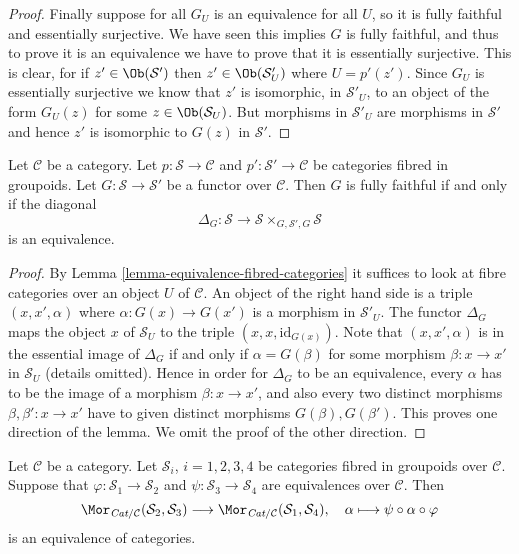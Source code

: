 \begin{proof}
\medskip\noindent
Finally suppose for all $G_U$ is an equivalence for all $U$, so it is
fully faithful and essentially surjective.  We have seen this implies $G$ is
fully faithful, and thus to prove it is an equivalence we have to prove that
it is essentially surjective.  This is clear, for if $z'\in
\Ob(\mathcal{S}')$ then $z'\in \Ob(\mathcal{S}'_U)$ where
$U = p'(z')$.  Since $G_U$ is essentially surjective we know that
$z'$ is isomorphic, in $\mathcal{S}'_U$, to an object of the form
$G_U(z)$ for some $z\in \Ob(\mathcal{S}_U)$.  But morphisms
in $\mathcal{S}'_U$ are morphisms in $\mathcal{S}'$ and hence $z'$ is
isomorphic to $G(z)$ in $\mathcal{S}'$.
\end{proof}

\begin{lemma}
\label{lemma-fully-faithful-diagonal-equivalence}
Let $\mathcal{C}$ be a category. Let $p : \mathcal{S}\to \mathcal{C}$ and
$p' : \mathcal{S'}\to \mathcal{C}$ be categories fibred in groupoids.
Let $G : \mathcal{S}\to \mathcal {S}'$ be a functor over $\mathcal{C}$.
Then $G$ is fully faithful if and only if the diagonal
$$
\Delta_G :
\mathcal{S}
\longrightarrow
\mathcal{S} \times_{G, \mathcal{S}', G} \mathcal{S}
$$
is an equivalence.
\end{lemma}

\begin{proof}
By
Lemma \ref{lemma-equivalence-fibred-categories}
it suffices to look at fibre categories over an object $U$ of $\mathcal{C}$.
An object of the right hand side is a triple $(x, x', \alpha)$ where
$\alpha : G(x) \to G(x')$ is a morphism in $\mathcal{S}'_U$.
The functor $\Delta_G$ maps the object $x$ of $\mathcal{S}_U$
to the triple $(x, x, \text{id}_{G(x)})$. Note that $(x, x', \alpha)$
is in the essential image of $\Delta_G$ if and only if $\alpha = G(\beta)$
for some morphism $\beta : x \to x'$ in $\mathcal{S}_U$ (details omitted).
Hence in order for $\Delta_G$ to be an equivalence, every $\alpha$ has to
be the image of a morphism $\beta : x \to x'$, and also every two
distinct morphisms $\beta, \beta' : x \to x'$ have to given distinct
morphisms $G(\beta), G(\beta')$. This proves one direction of the lemma.
We omit the proof of the other direction.
\end{proof}

\begin{lemma}
\label{lemma-morphisms-equivalent-fibred-groupoids}
Let $\mathcal{C}$ be a category.
Let $\mathcal{S}_i$, $i = 1, 2, 3, 4$ be categories fibred in
groupoids over $\mathcal{C}$.
Suppose that $\varphi : \mathcal{S}_1 \to \mathcal{S}_2$ and
$\psi : \mathcal{S}_3 \to \mathcal{S}_4$ are equivalences
over $\mathcal{C}$. Then
$$
\Mor_{\textit{Cat}/\mathcal{C}}(\mathcal{S}_2, \mathcal{S}_3)
\longrightarrow
\Mor_{\textit{Cat}/\mathcal{C}}(\mathcal{S}_1, \mathcal{S}_4),
\quad \alpha \longmapsto \psi \circ \alpha \circ \varphi
$$
is an equivalence of categories.
\end{lemma}

